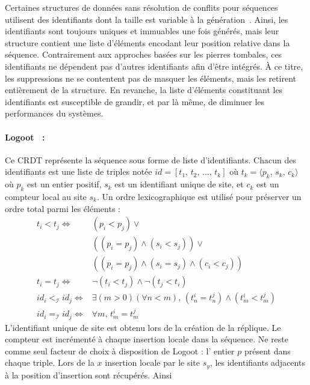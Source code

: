 Certaines structures de données sans résolution de conflits pour séquences
utilisent des identifiants dont la taille est variable à la
génération~\cite{andre2013supporting, preguica2009commutative,
  weiss2009logoot}. Ainsi, les identifiants sont toujours uniques et immuables
une fois générés, mais leur structure contient une liste d'éléments encodant
leur position relative dans la séquence.  Contrairement aux approches basées sur
les pierres tombales, ces identifiants ne dépendent pas d'autres identifiants
afin d'être intégrés. À ce titre, les suppressions ne se contentent pas de
masquer les éléments, mais les retirent entièrement de la structure. En
revanche, la liste d'éléments constituant les identifiants est susceptible de
grandir, et par là même, de diminuer les performances du systèmes.

\paragraph{Logoot~\cite{weiss2010collaborative, weiss2009logoot,
    weiss2010logootundo} :} Ce CRDT représente la séquence sous forme de liste
d'identifiants. Chacun des identifiants est une liste de triples notée
$id = [t_1,\,t_2,\,\ldots,\,t_k]$ où $t_k=\langle p_k,\,s_k,\,c_k \rangle$ où
$p_k$ est un entier positif, $s_k$ est un identifiant unique de site, et $c_k$
est un compteur local au site $s_k$. Un ordre lexicographique est utilisé pour
préserver un ordre total parmi les éléments :
\begin{align*}
  t_i < t_j \iff & (p_i < p_j) \vee \\
                 & ((p_i = p_j) \wedge (s_i<s_j)) \vee \\
                 & ((p_i = p_j) \wedge (s_i = s_j) \wedge (c_i < c_j)) \\
  t_i = t_j \iff & \neg (t_i < t_j) \wedge \neg (t_j < t_i) \\
  id_i <_\mathcal{I} id_j \iff & \exists (m > 0)(\forall n < m),\, (t^i_n = t^j_n) \wedge (t^i_m < t^j_m) \\
  id_i =_\mathcal{I} id_j \iff & \forall m,\, t^i_m = t^j_m
\end{align*}
L'identifiant unique de site est obtenu lors de la création de la réplique. Le
compteur est incrémenté à chaque insertion locale dans la séquence. Ne reste
comme seul facteur de choix à disposition de Logoot : l' entier $p$ présent dans
chaque triple. Lors de la $x$ insertion locale par le site $s_y$, les
identifiants adjacents à la position d'insertion sont récupérés. Ainsi
